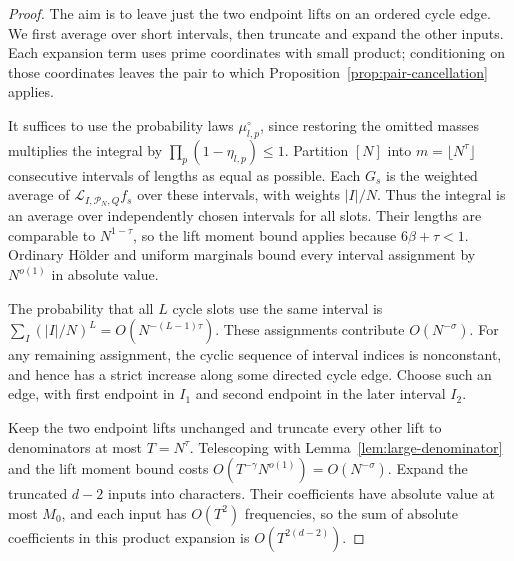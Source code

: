 \begin{proof}
The aim is to leave just the two endpoint lifts on an ordered cycle
edge.  We first average over short intervals, then truncate and expand
the other inputs.  Each expansion term uses prime coordinates with
small product; conditioning on those coordinates leaves the pair to
which Proposition~\ref{prop:pair-cancellation} applies.

It suffices to use the probability laws $\mu_{l,p}^\circ$, since restoring
the omitted masses multiplies the integral by
$\prod_p(1-\eta_{l,p})\le1$.
Partition $[N]$ into $m=\lfloor N^\tau\rfloor$ consecutive intervals
of lengths as equal as possible.  Each $G_s$ is the weighted average of
$\mathcal L_{I,\mathcal P_N,Q}f_s$ over these intervals, with weights
$|I|/N$.  Thus the integral is an average over independently chosen
intervals for all slots.  Their lengths are comparable to $N^{1-\tau}$,
so the lift moment bound applies because $6\beta+\tau<1$.
Ordinary H\"older and uniform marginals bound every interval assignment
by $N^{o(1)}$ in absolute value.

The probability that all $L$ cycle slots use the same interval is
$\sum_I(|I|/N)^L=O(N^{-(L-1)\tau})$.  These assignments contribute
$O(N^{-\sigma})$.  For any remaining assignment, the cyclic sequence of
interval indices is nonconstant, and hence has a strict increase along
some directed cycle edge.  Choose such an edge, with first endpoint in
$I_1$ and second endpoint in the later interval $I_2$.

Keep the two endpoint lifts unchanged and truncate every other lift to
denominators at most $T=N^\tau$.  Telescoping with
Lemma~\ref{lem:large-denominator} and the lift moment bound costs
$O(T^{-\gamma}N^{o(1)})=O(N^{-\sigma})$.  Expand the truncated $d-2$
inputs into characters.  Their coefficients have absolute value at most
$M_0$, and each input has $O(T^2)$ frequencies, so the sum of absolute
coefficients in this product expansion is $O(T^{2(d-2)})$.


\end{proof}
